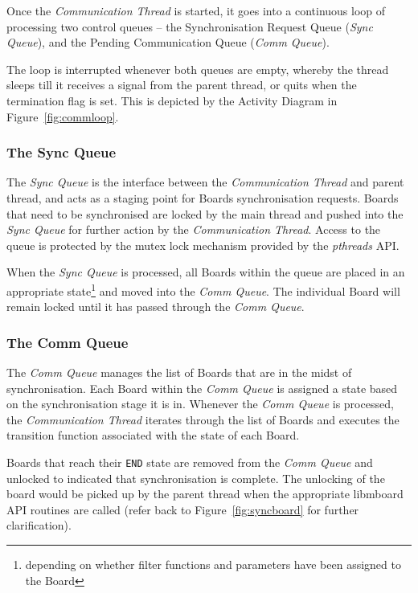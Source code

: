 Once the \textit{Communication Thread} is started, it goes into a continuous loop of processing two control queues -- the Synchronisation Request Queue (\textit{Sync Queue}), and the Pending Communication Queue (\textit{Comm Queue}). 

The loop is interrupted whenever both queues are empty, whereby the thread sleeps till it receives a signal from the parent thread, or quits when the termination flag is set. This is depicted by the Activity Diagram in Figure~\ref{fig:commloop}.

\subsubsection{The Sync Queue}
\label{sec:syncqueue}

The \textit{Sync Queue} is the interface between the \textit{Communication Thread} and parent thread, and acts as a staging point for Boards synchronisation requests. Boards that need to be synchronised are locked by the main thread and pushed into the \textit{Sync Queue} for further action by the \textit{Communication Thread}. Access to the queue is protected by the mutex lock mechanism provided by the \textit{pthreads} API.

When the \textit{Sync Queue} is processed, all Boards within the queue are placed in an appropriate state\footnote{depending on whether filter functions and parameters have been assigned to the Board} and moved into the \textit{Comm Queue}. The individual Board will remain locked until it has passed through the \textit{Comm Queue}.

\subsubsection{The Comm Queue}

The \textit{Comm Queue} manages the list of Boards that are in the midst of synchronisation. Each Board within the \textit{Comm Queue} is assigned a state based on the synchronisation stage it is in. Whenever the \textit{Comm Queue} is processed, the \textit{Communication Thread} iterates through the list of Boards and executes the transition function associated with the state of each Board. 

Boards that reach their \texttt{END} state are removed from the \textit{Comm Queue} and unlocked to indicated that synchronisation is complete. The unlocking of the board would be picked up by the parent thread when the appropriate libmboard API routines are called (refer back to Figure~\ref{fig:syncboard} for further clarification).

